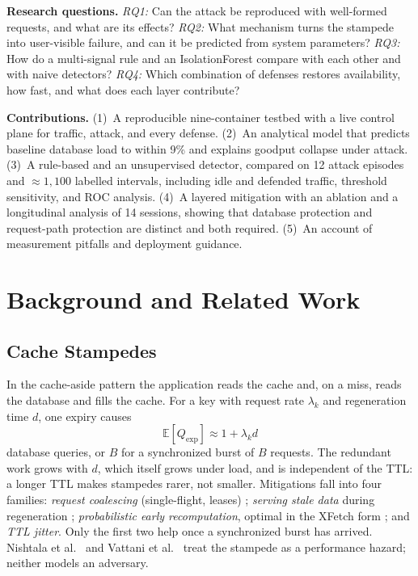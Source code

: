 \documentclass[journal]{IEEEtran}
\begin{document}
\textbf{Research questions.} \emph{RQ1:} Can the attack be reproduced with well-formed
requests, and what are its effects? \emph{RQ2:} What mechanism turns the stampede into
user-visible failure, and can it be predicted from system parameters? \emph{RQ3:} How
do a multi-signal rule and an IsolationForest compare with each other and with naive
detectors? \emph{RQ4:} Which combination of defenses restores availability, how fast,
and what does each layer contribute?

\textbf{Contributions.} (1)~A reproducible nine-container testbed with a live control
plane for traffic, attack, and every defense. (2)~An analytical model that predicts
baseline database load to within 9\% and explains goodput collapse under attack.
(3)~A rule-based and an unsupervised detector, compared on 12 attack episodes and
${\approx}1{,}100$ labelled intervals, including idle and defended traffic, threshold
sensitivity, and ROC analysis. (4)~A layered mitigation with an ablation and a
longitudinal analysis of 14 sessions, showing that database protection and request-path
protection are distinct and both required. (5)~An account of measurement pitfalls and
deployment guidance.

\section{Background and Related Work}
\label{sec:related}

\subsection{Cache Stampedes}
In the cache-aside pattern the application reads the cache and, on a miss, reads the
database and fills the cache. For a key with request rate
$\lambda_k$ and regeneration time $d$, one expiry causes
\begin{equation}
\mathbb{E}[Q_{\mathrm{exp}}] \approx 1 + \lambda_k d
\label{eq:stampede}
\end{equation}
database queries, or $B$ for a synchronized burst of $B$ requests. The redundant work
grows with $d$, which itself grows under load, and is independent of the TTL: a longer
TTL makes stampedes rarer, not smaller. Mitigations fall into four families:
\emph{request coalescing} (single-flight, leases) \cite{nishtala2013};
\emph{serving stale data} during regeneration \cite{rfc5861};
\emph{probabilistic early recomputation}, optimal in the XFetch form
\cite{vattani2015}; and \emph{TTL jitter}. Only the first two help once a synchronized
burst has arrived. Nishtala et al.\ \cite{nishtala2013} and Vattani et al.\
\cite{vattani2015} treat the stampede as a performance hazard; neither models an
adversary.
\end{document}
